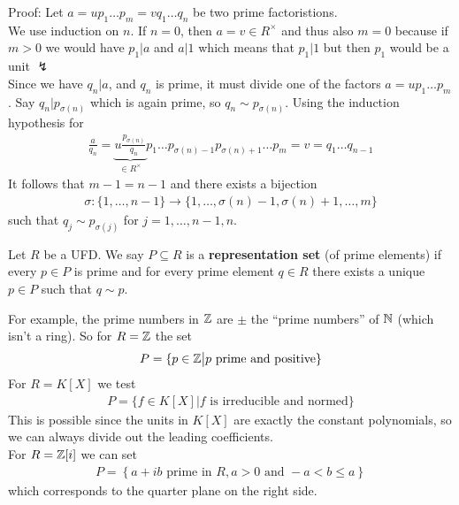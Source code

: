 Proof: Let $a = up_1 \dots p_m = v q_1 \ldots q_n$ be two prime factoristions.\\
We use induction on $n$. If $n = 0$, then $a = v \in R^{\times}$ and thus also $m = 0$ because if $m > 0$ we would have $p_1 | a$ and $a | 1$ which means that $p_1 | 1$ but then $p_1$ would be a unit $\lightning$\\

Since we have $q_n | a$, and $q_n$ is prime, it must divide one of the factors $a = u p_1 \dots p_m$. Say $q_n | p_{\sigma(n)}$ which is again prime, so $q_n \sim p_{\sigma(n)}$. Using the induction hypothesis for
\begin{align*}
	\frac{a}{q_n} = \underbrace{u \frac{p_{\sigma(n)}}{q_n}}_{\in R^{\times}}p_1 \dots p_{\sigma(n)-1} p_{\sigma(n) + 1} \dots p_m = v = q_1 \dots q_{n-1}
\end{align*}
It follows that $m-1 = n-1$ and there exists a bijection
\begin{align*}
	\sigma: \{1, \ldots, n-1\} \to \{1, \ldots, \sigma(n)-1, \sigma(n)+1, \ldots, m\}
\end{align*}
such that $q_j \sim p_{\sigma(j)}$ for $j =1, \ldots, n-1, n$.\\

\begin{definition}[]
	Let $R$ be a UFD. We say $P \subseteq R$ is a \textbf{representation set}  (of prime elements) if every $p \in P$ is prime and for every prime element $q \in R$ there exists a unique $p \in P$ such that $q \sim p$.
\end{definition}
For example, the prime numbers in $\mathbb{Z}$ are $\pm$ the ``prime numbers'' of $\mathbb{N}$ (which isn't a ring). So for $R = \mathbb{Z}$ the set
\begin{align*}
	P = \{p \in \mathbb{Z} \big\vert p \text{ prime and positive}\}
\end{align*}
For $R = K[X]$ we test
\begin{align*}
	P = \{f \in K[X] \big\vert f \text{ is irreducible and normed}\}
\end{align*}
This is possible since the units in $K[X]$ are exactly the constant polynomials, so we can always divide out the leading coefficients.\\

For $R = \mathbb{Z}[i]$ we can set
\begin{align*}
	P = \left\{a + ib \text{ prime in }R, a > 0 \text{ and } -a < b \leq a\right\}
\end{align*}
which corresponds to the quarter plane on the right side.

